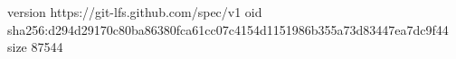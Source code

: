 version https://git-lfs.github.com/spec/v1
oid sha256:d294d29170c80ba86380fca61cc07c4154d1151986b355a73d83447ea7dc9f44
size 87544
